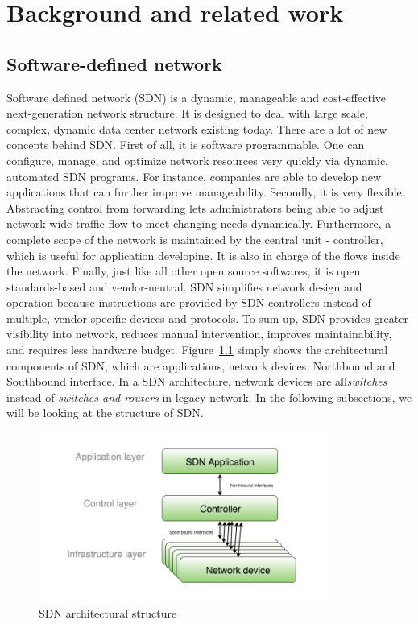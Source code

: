 \chapter{Background and related work}

\section{Software-defined network}
\label{Software-defined network}
Software defined network (SDN) is a dynamic, manageable and cost-effective next-generation network structure. It is designed to deal with large scale, complex, dynamic data center network existing today. There are a lot of new concepts behind SDN. First of all, it is software programmable. One can configure, manage, and optimize network resources very quickly via dynamic, automated SDN programs. For instance, companies are able to develop new applications that can further improve manageability. Secondly, it is very flexible. Abstracting control from forwarding lets administrators being able to adjust network-wide traffic flow to meet changing needs dynamically. Furthermore, a complete scope of the network is maintained by the central unit - controller, which is useful for application developing. It is also in charge of the flows inside the network. Finally, just like all other open source softwares, it is open standards-based and vendor-neutral. SDN simplifies network design and operation because instructions are provided by SDN controllers instead of multiple, vendor-specific devices and protocols. To sum up, SDN provides greater visibility into network, reduces manual intervention, improves maintainability, and requires less hardware budget. Figure~\ref{SDN_struct} simply shows the architectural components of SDN, which are applications, network devices, Northbound and Southbound interface. In a SDN architecture, network devices are all\textit{switches} instead of \textit{switches and routers} in legacy network. In the following subsections, we will be looking at the structure of SDN.

\begin{figure}[H]
\begin{center} 
\includegraphics[width=0.85\textwidth]{figures/SDN_structure.png}
\end{center}
\caption{SDN architectural structure}
\label{SDN_struct}
\end{figure}


